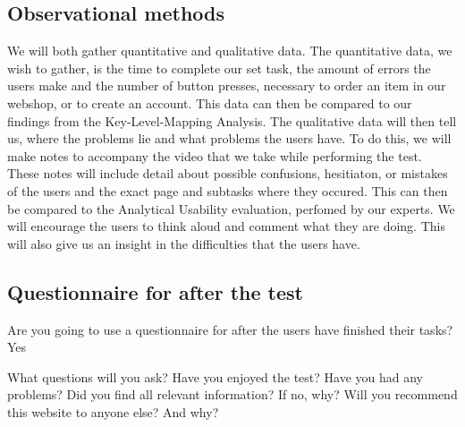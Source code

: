\subsection{Observational methods}
We will both gather quantitative and qualitative data. The quantitative data, we wish to gather, is the time to complete our set task, the amount of errors the users make and the number of button presses, necessary to order an item in our webshop, or to create an account. This data can then be compared to our findings from the Key-Level-Mapping Analysis. The qualitative data will then tell us, where the problems lie and what problems the users have. To do this, we will make notes to accompany the video that we take while performing the test. These notes will include detail about possible confusions, hesitiaton, or mistakes of the users and the exact page and subtasks where they occured. This can then be compared to the Analytical Usability evaluation, perfomed by our experts.
We will encourage the users to think aloud and comment what they are doing. This will also give us an insight in the difficulties that the users have.

\subsection{Questionnaire for after the test}
Are you going to use a questionnaire for after the users have finished their tasks?
Yes


What questions will you ask? 
Have you enjoyed the test?
Have you had any problems?
Did you find all relevant information? If no, why?
Will you recommend this website to anyone else? And why?


